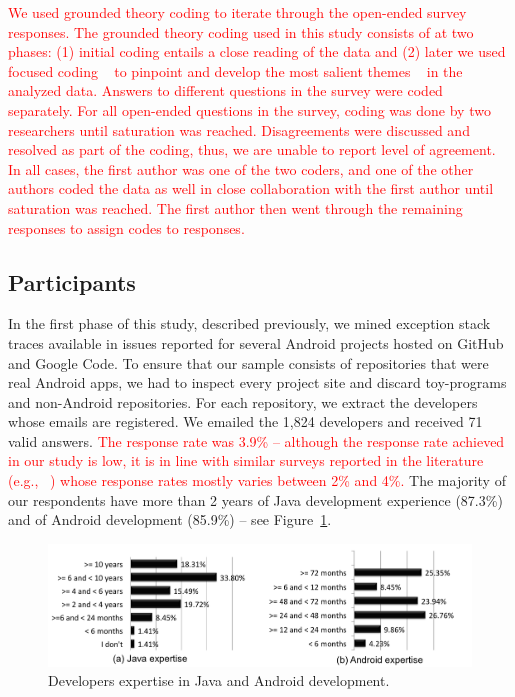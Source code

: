 \textcolor{red}{We used grounded theory coding to iterate through the open-ended survey responses. The grounded theory coding used in this study consists of at two phases: (1) initial coding entails a close reading of the data and (2) later we used focused coding ~\cite{charmaz2006} to pinpoint and develop the most salient themes ~\cite{charmaz2006} in the analyzed data. Answers to different questions in the survey were coded separately. For all open-ended questions in the survey, coding was done by two researchers until saturation was reached. Disagreements were discussed and resolved as part of the coding, thus, we are unable to report level of agreement. In all cases, the first author was one of the two coders, and one of the other authors coded the data as well in close collaboration with the first author until saturation was reached. The first author then went through the remaining responses to assign codes to responses.}



\subsection{Participants}

 In the first phase of this study, described previously, we mined exception stack traces available in issues reported for several Android projects hosted on GitHub and Google Code. To ensure that our sample consists of repositories that were real Android apps, we had to inspect every project site and discard toy-programs and non-Android repositories. For each repository, we extract the developers whose emails are registered. We emailed the 1,824 developers and received 71 valid answers. \textcolor{red}{The response rate was 3.9\% --
although the response rate achieved in our study is low, it is in line with similar surveys reported in the literature (e.g., ~\cite{kochhar2015understanding,joorabchi2013real,bavota2015impact,ko2007information,hindle2015topics}) whose response rates mostly varies between 2\% and 4\%.}
The majority of our respondents have more than 2 years of Java development experience (87.3\%) and of Android development (85.9\%) -- see Figure~\ref{fig:devexpertise}.

\begin{figure} \centering \includegraphics[scale=0.38]{expertise_new_point.png}
\caption{Developers expertise in Java and Android development.}
\label{fig:devexpertise}
\end{figure}

